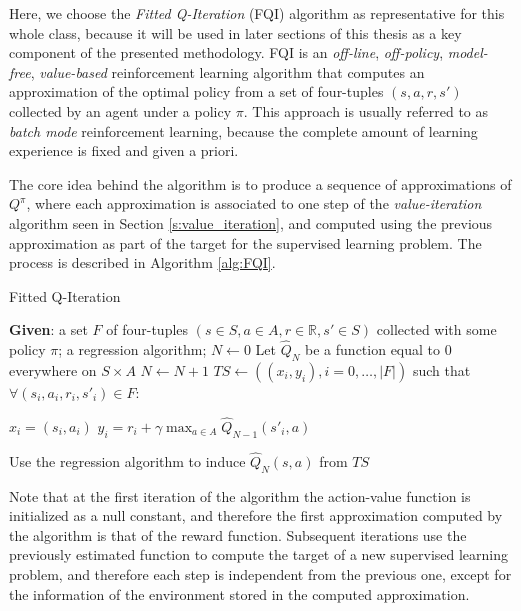 Here, we choose the \textit{Fitted Q-Iteration} (FQI) \cite{ernst2005tree} 
algorithm as representative for this whole class, because it will be used in 
later sections of this thesis as a key component of the presented methodology.
FQI is an \textit{off-line}, \textit{off-policy}, \textit{model-free}, 
\textit{value-based} reinforcement learning algorithm that computes an 
approximation of the optimal policy from a set of four-tuples $(s, a, r, s')$
collected by an agent under a policy $\pi$.
This approach is usually referred to as \textit{batch mode} reinforcement 
learning, because the complete amount of learning experience is fixed and given
a priori.

The core idea behind the algorithm is to produce a sequence of approximations of
$Q^\pi$, where each approximation is associated to one step of the 
\textit{value-iteration} algorithm seen in Section \ref{s:value_iteration}, 
and computed using the previous approximation as part of the target for the 
supervised learning problem. The process is described in Algorithm \ref{alg:FQI}.
%
\begin{algorithm}
    \caption{Fitted Q-Iteration}
    \label{alg:FQI}
    \begin{algorithmic}
        \STATE \textbf{Given}: a set $F$ of four-tuples $(s \in S, a \in A, r \in \mathbb{R}, s' \in S)$ collected with some policy $\pi$; a regression algorithm;
        \STATE $N \leftarrow 0$
        \STATE Let $\hat{Q}_N$ be a function equal to $0$ everywhere on $S \times A$
        \REPEAT
	    \STATE $N \leftarrow N+1$
	    \STATE $TS \leftarrow ((x_i, y_i), i = 0, \dots, |F|)$ such that $\forall (s_i, a_i, r_i, s'_i) \in F$:
		\begin{ALC@g}
		    \STATE $x_i = (s_i, a_i)$
		    \STATE $y_i = r_i + \gamma \max_{a \in A} \hat{Q}_{N-1} (s'_i, a)$
		\end{ALC@g}
	    \STATE Use the regression algorithm to induce $\hat{Q}_N(s, a)$ from $TS$
    \end{algorithmic}
\end{algorithm}
%

Note that at the first iteration of the algorithm the action-value function is
initialized as a null constant, and therefore the first approximation computed 
by the algorithm is that of the reward function.
Subsequent iterations use the previously estimated function to compute the 
target of a new supervised learning problem, and therefore each step is 
independent from the previous one, except for the information of the environment 
stored in the computed approximation. 


